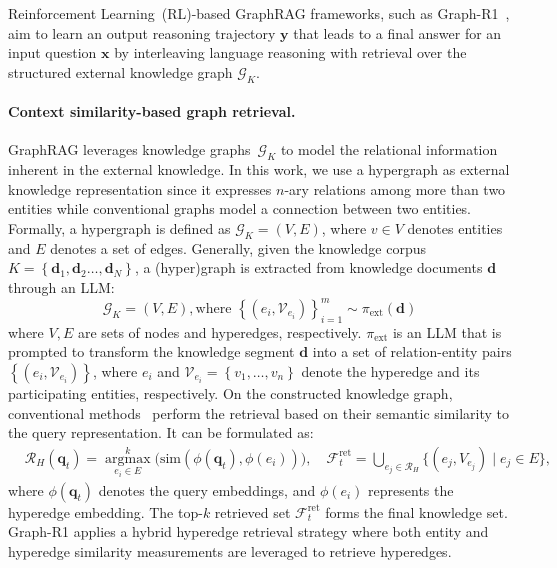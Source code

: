 Reinforcement Learning~(RL)-based GraphRAG frameworks, such as Graph-R1~\citep{luo2025graph}, aim to learn an output reasoning trajectory $\boldsymbol{y}$ that leads to a final answer for an input question $\boldsymbol{x}$ by interleaving language reasoning with retrieval over the structured external knowledge graph $\mathcal{G}_K$.

\paragraph{Context similarity-based graph retrieval.}
GraphRAG leverages knowledge graphs~$\mathcal{G}_K$ to model the relational information inherent in the external knowledge.
In this work, we use a hypergraph as external knowledge representation since it expresses $n$-ary relations among more than two entities while conventional graphs model a connection between two entities.
Formally, a hypergraph is defined as $\mathcal{G}_K = \left(V, E\right)$, where $v \in V$ denotes entities and $E$ denotes a set of edges.
Generally, given the knowledge corpus ${K} = \left\{\boldsymbol{d}_1,\boldsymbol{d}_2 \dots, \boldsymbol{d}_N \right\}$, a (hyper)graph is extracted from knowledge documents $\boldsymbol{d}$ through an LLM:
\begin{equation}
    \mathcal{G}_K = \left(V, E \right), \text{where } \left\{\left(e_i, \mathcal{V}_{e_i} \right) \right\}_{i=1}^m \sim \pi_{\text{ext}}\left(\boldsymbol{d}\right)
\end{equation}
where $V, E$ are sets of nodes and hyperedges, respectively.
$\pi_{\text{ext}}$ is an LLM that is prompted to transform the knowledge segment $\boldsymbol{d}$ into a set of relation-entity pairs $\left\{\left(e_i, \mathcal{V}_{e_i} \right) \right\}$, where $e_i$ and $\mathcal{V}_{e_i}=\left\{v_1, \dots, v_n \right\}$ denote the hyperedge and its participating entities, respectively.
On the constructed knowledge graph, conventional methods~\citep{jin2025search} perform the retrieval based on their semantic similarity to the query representation.
It can be formulated as:
\begin{equation}
\begin{split}
&\mathcal{R}_{H}\left(\boldsymbol{q}_t \right) = \operatorname*{argmax}_{e_i \in E}^{k} \Big( \text{sim}(\phi(\boldsymbol{q}_t),\phi(e_i)) \Big), \quad \mathcal{F}_{t}^{\text{ret}} = \bigcup_{e_j \in \mathcal{R}_{H}} \{(e_j, V_{e_j}) \mid  e_j \in E\},
\end{split}
\end{equation}
where $\phi(\boldsymbol{q}_t)$ denotes the query embeddings, and $\phi(e_i)$ represents the hyperedge embedding.
The top-$k$ retrieved set $\mathcal{F}_t^{\text{ret}}$ forms the final knowledge set.
Graph-R1 applies a hybrid hyperedge retrieval strategy where both entity and hyperedge similarity measurements are leveraged to retrieve hyperedges.

